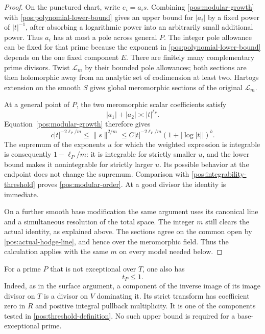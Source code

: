 \documentclass[11pt,letterpaper]{article}
\theoremstyle{definition}
\theoremstyle{remark}
\begin{document}
\begin{proof}
On the punctured chart, write \(e_i=a_i s\). Combining
\eqref{pos:modular-growth} with
\eqref{pos:polynomial-lower-bound} gives an upper bound for
\(|a_i|\) by a fixed power of \(|t|^{-1}\), after absorbing a
logarithmic power into an arbitrarily small additional power. Thus
\(a_i\) has at most a pole across general \(P\). The integer pole
allowance can be fixed for that prime because the exponent in
\eqref{pos:polynomial-lower-bound} depends on the one fixed component
\(E\). There are finitely many complementary prime divisors. Twist
\(\mathcal L_m\) by their bounded pole allowances; both sections
are then holomorphic away from an analytic set of codimension at
least two. Hartogs extension on the smooth \(S\) gives global
meromorphic sections of the original \(\mathcal L_m\).

At a general point of \(P\), the two meromorphic scalar coefficients
satisfy
\[
 |a_1|+|a_2|\asymp |t|^{\ell_P}.
\]
Equation~\eqref{pos:modular-growth} therefore gives
\begin{equation}\label{pos:frame-order-growth}
 c|t|^{-2\ell_P/m}
 \leq\|s\|^{2/m}
 \leq C|t|^{-2\ell_P/m}(1+|\log|t||)^b.
\end{equation}
The supremum of the exponents \(u\) for which the weighted expression
is integrable is consequently \(1-\ell_P/m\): it is integrable for
strictly smaller \(u\), and the lower bound makes it nonintegrable
for strictly larger \(u\). Its possible behavior at the endpoint
does not change the supremum. Comparison with
\eqref{pos:integrability-threshold} proves
\eqref{pos:modular-order}. At a good divisor the identity is immediate.

On a further smooth base modification the same argument uses its
canonical line and a simultaneous resolution of the total space.
The integer \(m\) still clears the actual identity, as explained
above. The sections agree on the common open by
\eqref{pos:actual-hodge-line}, and hence over the meromorphic field.
Thus the calculation applies with the same \(m\) on every model
needed below.
\end{proof}

For a prime \(P\) that is not exceptional over \(T\), one also has
\begin{equation}\label{pos:nonexceptional-threshold}
 t_P\leq1.
\end{equation}
Indeed, as in the surface argument, a component of the inverse image
of its image divisor on \(T\) is a divisor on \(V\) dominating it.
Its strict transform has coefficient zero in \(R\) and positive
integral pullback multiplicity. It is one of the components tested in
\eqref{pos:threshold-definition}. No such upper bound is required
for a base-exceptional prime.
\end{document}
